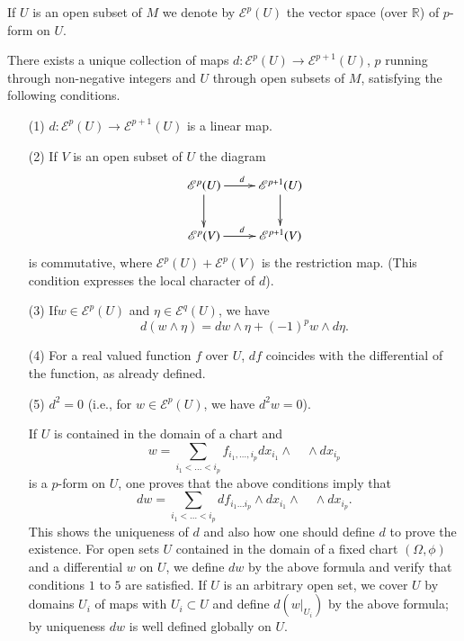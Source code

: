 If $U$ is an open subset of $M$ we denote by $\mathscr{E}^{p}(U)$ the vector space (over $\mathbb{R}$) of $p$-form on $U$.

\begin{proposition}\label{chap4-prop4.1}
There exists a unique collection of maps $d:\mathscr{E}^{p}(U)\to \mathscr{E}^{p+1}(U)$, $p$ running through non-negative integers and $U$ through open subsets of $M$, satisfying the following conditions.
\begin{itemize}
\item[\rm(1)] $d:\mathscr{E}^{p}(U)\to \mathscr{E}^{p+1}(U)$ is a linear map.

\item[\rm(2)] If $V$ is an open subset of $U$ the diagram
\[
\xymatrix{
\mathscr{E}^{p}(U)\ar[d]\ar[r]^{d} & \mathscr{E}^{p+1}(U)\ar[d]\\
\mathscr{E}^{p}(V)\ar[r]^{d} & \mathscr{E}^{p+1}(V)
}
\]
is commutative, where $\mathscr{E}^{p}(U)+\mathscr{E}^{p}(V)$ is the restriction map. (This condition expresses the local character of $d$).

\item[\rm(3)] If\pageoriginale $w\in \mathscr{E}^{p}(U)$ and $\eta\in \mathscr{E}^{q}(U)$, we have
$$
d(w\wedge \eta)=dw\wedge \eta+(-1)^{p}w\wedge d\eta.
$$

\item[\rm(4)] For a real valued function $f$ over $U$, $df$ coincides with the differential of the function, as already defined.

\item[\rm(5)] $d^{2}=0$ (i.e., for $w\in \mathscr{E}^{p}(U)$, we have $d^{2}w=0$).

If $U$ is contained in the domain of a chart and
$$
w=\sum\limits_{i_{1}<\ldots < i_{p}}f_{i_{1},\ldots,i_{p}}dx_{i_{1}}\wedge\quad\wedge dx_{i_{p}}
$$
is a $p$-form on $U$, one proves that the above conditions imply that
$$
dw=\sum\limits_{i_{1}<\ldots<i_{p}}df_{i_{1}\ldots i_{p}}\wedge dx_{i_{1}}\wedge\quad\wedge dx_{i_{p}}.
$$
This shows the uniqueness of $d$ and also how one should define $d$ to prove the existence. For open sets $U$ contained in the domain of a fixed chart $(\Omega,\phi)$ and a differential $w$ on $U$, we define $dw$ by the above formula and verify that conditions $1$ to $5$ are satisfied. If $U$ is an arbitrary open set, we cover $U$ by domains $U_{i}$ of maps with $U_{i}\subset U$ and define $d(w|_{U_{i}})$ by the above formula; by uniqueness $dw$ is well defined globally on $U$.
\end{itemize}
\end{proposition}

